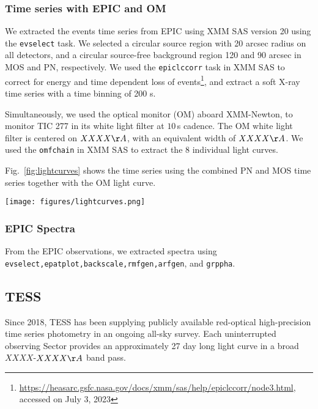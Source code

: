 \documentclass[twocolumn]{aastex631}
\begin{document}
\subsubsection{Time series with EPIC and OM}

 We extracted the events time series from EPIC using XMM SAS version 20 using the \texttt{evselect} task. We selected a circular source region with 20 arcsec radius on all detectors, and a circular source-free background region 120 and 90 arcsec in MOS and PN, respectively. We used the \texttt{epiclccorr} task in XMM SAS to correct for energy and time dependent loss of events\footnote{\url{https://heasarc.gsfc.nasa.gov/docs/xmm/sas/help/epiclccorr/node3.html}, accessed on July 3, 2023}, and extract a soft X-ray time series with a time binning of 200 s.

Simultaneously, we used the optical monitor (OM) aboard XMM-Newton, to monitor TIC 277 in its white light filter at $10$\,s cadence. The OM white light filter is centered on $XXXX\AA$, with an equivalent width of $XXXX\AA$. We used the \texttt{omfchain} in XMM SAS to extract the 8 individual light curves.

Fig.~\ref{fig:lightcurves} shows the time series using the combined PN and MOS time series together with the OM light curve.

\begin{figure*}[ht!]
    \begin{centering}
        \texttt{[image: figures/lightcurves.png]}
        \caption{
         Top panel: Optical Monitoring (OM) light curve. Bottom panel: X-ray (PN, MOS1 and MOS2 combined) light curve. 
        }
        \label{fig:lightcurves}
    \end{centering}
\end{figure*}


\subsubsection{EPIC Spectra}
From the EPIC observations, we extracted spectra using \texttt{evselect,epatplot,backscale,rmfgen,arfgen}, and \texttt{grppha}. 

\subsection{TESS}

Since 2018, TESS has been supplying publicly available red-optical high-precision time series photometry in an ongoing all-sky survey. Each uninterrupted observing Sector provides an approximately 27 day long light curve in a broad $XXXX$-$XXXX\AA$ band pass. 
\end{document}
